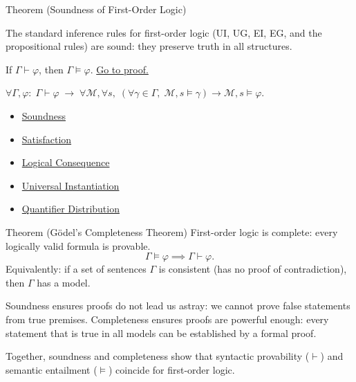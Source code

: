 \begin{theorembox}{Theorem (Soundness of First-Order Logic)}
\begin{theorem}\label{thm:fol-sound}
The standard inference rules for first-order logic (UI, UG, EI, EG, and the
propositional rules) are sound: they preserve truth in all structures.

If $\Gamma \vdash \varphi$, then $\Gamma \models \varphi$.
\hyperref[prf:fol-sound]{Go to proof.}
\end{theorem}
\end{theorembox}

\begin{remark*}
$\forall \Gamma,\varphi:\; \Gamma\vdash\varphi \;\to\; \forall\mathcal{M},\forall s,\; (\forall\gamma\in\Gamma,\; \mathcal{M},s\models\gamma) \to \mathcal{M},s\models\varphi$.
\end{remark*}

\begin{dependencies}
\begin{itemize}
  \item \hyperref[def:fol-soundness]{Soundness}
  \item \hyperref[def:fol-satisfaction]{Satisfaction}
  \item \hyperref[def:log-consequence]{Logical Consequence}
  \item \hyperref[ax:predicate-logic-universal-instantiation]{Universal Instantiation}
  \item \hyperref[ax:predicate-logic-quantifier-distribution]{Quantifier Distribution}
\end{itemize}
\end{dependencies}

\begin{theorembox}{Theorem (Gödel's Completeness Theorem)}
\label{thm:godel-complete}
First-order logic is complete: every logically valid formula is provable.
\[
\Gamma \models \varphi \implies \Gamma \vdash \varphi.
\]
Equivalently: if a set of sentences $\Gamma$ is consistent (has no proof of
contradiction), then $\Gamma$ has a model.
\end{theorembox}

\begin{remark*}
Soundness ensures proofs do not lead us astray: we cannot prove false statements
from true premises. Completeness ensures proofs are powerful enough: every
statement that is true in all models can be established by a formal proof.

Together, soundness and completeness show that syntactic provability ($\vdash$)
and semantic entailment ($\models$) coincide for first-order logic.
\end{remark*}

